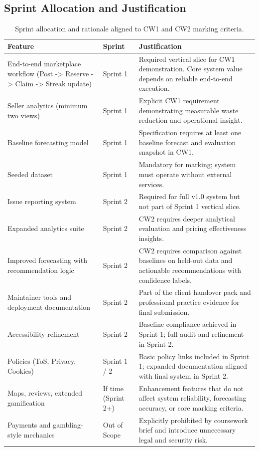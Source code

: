 \documentclass[11pt, a4paper]{report}
\begin{document}
\subsection{Sprint Allocation and Justification}
\renewcommand{\arraystretch}{1.3}
\begin{table}[H]
\centering
\begin{tabular}{|p{4cm}|p{2cm}|p{8cm}|}
\hline
\textbf{Feature} & \textbf{Sprint} & \textbf{Justification} \\
\hline
End-to-end marketplace workflow (Post -> Reserve -> Claim -> Streak update) &
Sprint 1 &
Required vertical slice for CW1 demonstration. Core system value depends on reliable end-to-end execution. \\
\hline
Seller analytics (minimum two views) &
Sprint 1 &
Explicit CW1 requirement demonstrating measurable waste reduction and operational insight. \\
\hline
Baseline forecasting model &
Sprint 1 &
Specification requires at least one baseline forecast and evaluation snapshot in CW1. \\
\hline
Seeded dataset &
Sprint 1 &
Mandatory for marking; system must operate without external services. \\
\hline
Issue reporting system &
Sprint 2 &
Required for full v1.0 system but not part of Sprint 1 vertical slice. \\
\hline
Expanded analytics suite &
Sprint 2 &
CW2 requires deeper analytical evaluation and pricing effectiveness insights. \\
\hline
Improved forecasting with recommendation logic &
Sprint 2 &
CW2 requires comparison against baselines on held-out data and actionable recommendations with confidence labels. \\
\hline
Maintainer tools and deployment documentation &
Sprint 2 &
Part of the client handover pack and professional practice evidence for final submission. \\
\hline
Accessibility refinement &
Sprint 2 &
Baseline compliance achieved in Sprint 1; full audit and refinement in Sprint 2. \\
\hline
Policies (ToS, Privacy, Cookies) &
Sprint 1 / 2 &
Basic policy links included in Sprint 1; expanded documentation aligned with final system in Sprint 2. \\
\hline
Maps, reviews, extended gamification &
If time (Sprint 2+) &
Enhancement features that do not affect system reliability, forecasting accuracy, or core marking criteria. \\
\hline
Payments and gambling-style mechanics &
Out of Scope &
Explicitly prohibited by coursework brief and introduce unnecessary legal and security risk. \\
\hline
\end{tabular}
\caption{Sprint allocation and rationale aligned to CW1 and CW2 marking criteria.}
\end{table}
\end{document}
